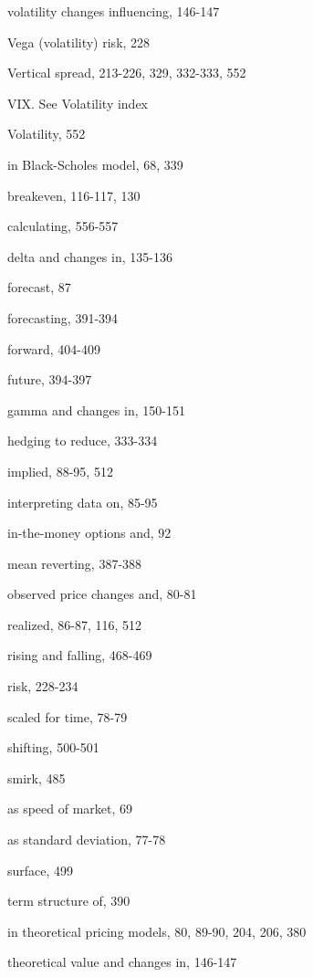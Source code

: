 \noindent volatility changes influencing, 146-147\par
\noindent Vega (volatility) risk, 228\par
\noindent Vertical spread, 213-226, 329, 332-333, 552\par
\noindent VIX. See Volatility index\par
\noindent Volatility, 552\par
\noindent in Black-Scholes model, 68, 339\par
\noindent breakeven, 116-117, 130\par
\noindent calculating, 556-557\par
\noindent delta and changes in, 135-136\par
\noindent forecast, 87\par
\noindent forecasting, 391-394\par
\noindent forward, 404-409\par
\noindent future, 394-397\par
\noindent gamma and changes in, 150-151\par
\noindent hedging to reduce, 333-334\par
\noindent implied, 88-95, 512\par
\noindent interpreting data on, 85-95\par
\noindent in-the-money options and, 92\par
\noindent mean reverting, 387-388\par
\noindent observed price changes and, 80-81\par
\noindent realized, 86-87, 116, 512\par
\noindent rising and falling, 468-469\par
\noindent risk, 228-234\par
\noindent scaled for time, 78-79\par
\noindent shifting, 500-501\par
\noindent smirk, 485\par
\noindent as speed of market, 69\par
\noindent as standard deviation, 77-78\par
\noindent surface, 499\par
\noindent term structure of, 390\par
in theoretical pricing models, 80, 89-90, 204, 206, 380\par
\noindent theoretical value and changes in, 146-147\par

